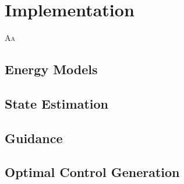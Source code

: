 
\chapter{\color{red}Implementation}
\label{app:imp}

\lettrine{A}{a}


\section{\color{red}Energy Models}


\section{\color{red}State Estimation}


\section{\color{red}Guidance}


\section{\color{red}Optimal Control Generation}



